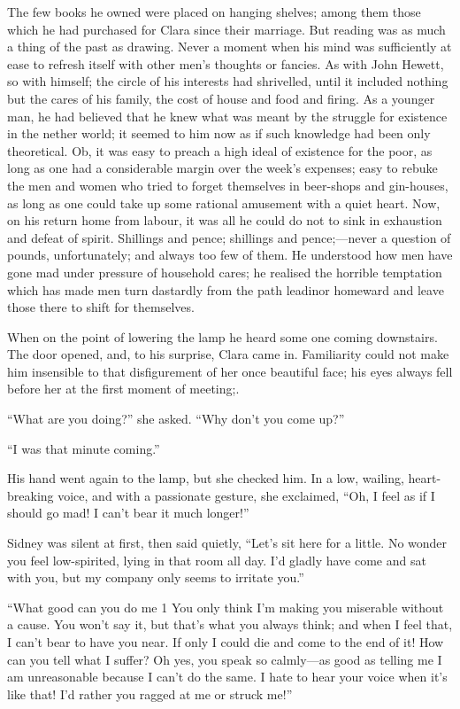 The few books he owned were placed on hanging shelves; among them those
which he had purchased for Clara since their marriage. But reading was
as much a thing of the past as drawing. Never a moment when his mind was
sufficiently at ease to refresh itself with other men's thoughts or
fancies. As with John Hewett, so with himself; the circle of {}his
interests had shrivelled, until it included nothing but the cares of his
family, the cost of house and food and firing. As a younger man, he had
believed that he knew what was meant by the struggle for existence in
the nether world; it seemed to him now as if such knowledge had been
only theoretical. Ob, it was easy to preach a high ideal of existence
for the poor, as long as one had a considerable margin over the week's
expenses; easy to rebuke the men and women who tried to forget
themselves in beer-shops and gin-houses, as long as one could take up
some rational amusement with a quiet heart. Now, on his return home from
labour, it was all he could do not to sink in exhaustion and defeat of
spirit. Shillings and pence; shillings and pence;---never a question of
pounds, unfortunately; and always too few of them. He understood how men
have gone mad under pressure of household cares; he realised the
horrible temptation which has made men turn dastardly from the path
leadinor homeward and leave those there to shift for themselves.

When on the point of lowering the lamp he heard some one coming
downstairs. The {}door opened, and, to his surprise, Clara came in.
Familiarity could not make him insensible to that disfigurement of her
once beautiful face; his eyes always fell before her at the first moment
of meeting;.

``What are you doing?'' she asked. ``Why don't you come up?''

``I was that minute coming.''

His hand went again to the lamp, but she checked him. In a low, wailing,
heart-breaking voice, and with a passionate gesture, she exclaimed,
``Oh, I feel as if I should go mad! I can't bear it much longer!''

Sidney was silent at first, then said quietly, ``Let's sit here for a
little. No wonder you feel low-spirited, lying in that room all day. I'd
gladly have come and sat with you, but my company only seems to irritate
you.''

``What good can you do me 1 You only think I'm making you miserable
without a cause. You won't say it, but that's what you always think; and
when I feel that, I can't bear to have you near. If only I could die and
come to the end of it! How can you tell what I suffer? Oh yes, you speak
so calmly---as good as telling me I am {}unreasonable because I can't do
the same. I hate to hear your voice when it's like that! I'd rather you
ragged at me or struck me!''

